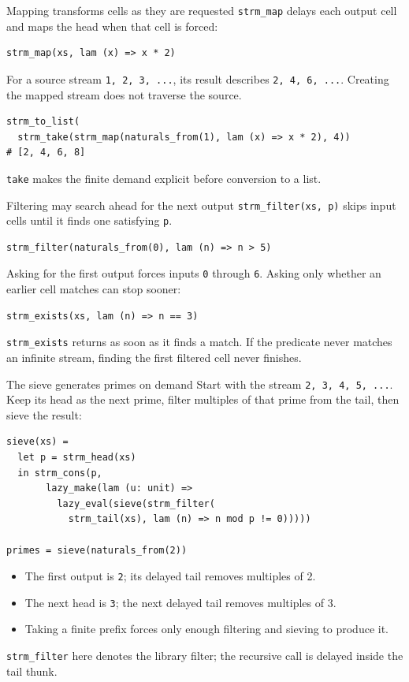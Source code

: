 \documentclass[aspectratio=169,10pt]{beamer}
\begin{document}
\begin{frame}[fragile]{Mapping transforms cells as they are requested}
  \texttt{strm\_map} delays each output cell and maps the head when that cell
  is forced:
  \begin{lstlisting}
strm_map(xs, lam (x) => x * 2)
  \end{lstlisting}
  For a source stream \texttt{1, 2, 3, ...}, its result describes
  \texttt{2, 4, 6, ...}. Creating the mapped stream does not traverse the source.
  \begin{lstlisting}
strm_to_list(
  strm_take(strm_map(naturals_from(1), lam (x) => x * 2), 4))
# [2, 4, 6, 8]
  \end{lstlisting}
  \texttt{take} makes the finite demand explicit before conversion to a list.
\end{frame}

\begin{frame}[fragile]{Filtering may search ahead for the next output}
  \texttt{strm\_filter(xs, p)} skips input cells until it finds one satisfying \texttt{p}.
  \begin{lstlisting}
strm_filter(naturals_from(0), lam (n) => n > 5)
  \end{lstlisting}
  Asking for the first output forces inputs \texttt{0} through \texttt{6}.
  Asking only whether an earlier cell matches can stop sooner:
  \begin{lstlisting}
strm_exists(xs, lam (n) => n == 3)
  \end{lstlisting}
  \texttt{strm\_exists} returns as soon as it finds a match. If the predicate
  never matches an infinite stream, finding the first filtered cell never finishes.
\end{frame}

\begin{frame}[fragile]{The sieve generates primes on demand}
  Start with the stream \texttt{2, 3, 4, 5, ...}. Keep its head as the next
  prime, filter multiples of that prime from the tail, then sieve the result:
  \begin{lstlisting}
sieve(xs) =
  let p = strm_head(xs)
  in strm_cons(p,
       lazy_make(lam (u: unit) =>
         lazy_eval(sieve(strm_filter(
           strm_tail(xs), lam (n) => n mod p != 0)))))

primes = sieve(naturals_from(2))
  \end{lstlisting}
  \begin{itemize}
    \item The first output is \texttt{2}; its delayed tail removes multiples of 2.
    \item The next head is \texttt{3}; the next delayed tail removes multiples of 3.
    \item Taking a finite prefix forces only enough filtering and sieving to produce it.
  \end{itemize}
  \texttt{strm\_filter} here denotes the library filter; the recursive call is
  delayed inside the tail thunk.
\end{frame}
\end{document}
